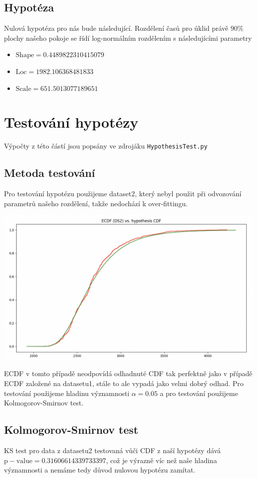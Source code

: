 \documentclass[11pt]{article}
\def\code#1{\texttt{#1}}
\begin{document}
\subsection{Hypotéza}
Nulová hypotéza pro nás bude následující. Rozdělení časů pro úklid právě $90\%$ plochy našeho pokoje se řídí log-normálním rozdělením s následujícími parametry
\begin{itemize}
	\item $\mathrm{Shape} = 0.4489822310415079$
	\item $\mathrm{Loc} = 1982.106368481833$
	\item $\mathrm{Scale}= 651.5013077189651$
\end{itemize}

\section{Testování hypotézy}
Výpočty z této částí jsou popsány ve zdrojáku \code{HypothesisTest.py}
\subsection{Metoda testování}
Pro testování hypotézu použijeme dataset2, který nebyl použit při odvozování parametrů našeho rozdělení, takže nedochází k over-fittingu.
\begin{center}
	\includegraphics[scale=0.4]{Images/ECDFDS2.png}
\end{center}
ECDF v tomto případě neodpovídá odhadnuté CDF tak perfektně jako v případě ECDF založené na datasetu1, stále to ale vypadá jako velmi dobrý odhad. Pro testování použijeme hladinu významnosti $\alpha=0.05$ a pro testování použijeme Kolmogorov-Smirnov test.
\subsection{Kolmogorov-Smirnov test}
KS test pro data z datasetu2 testovaná vůči CDF z naší hypotézy dává $\mathrm{p-value}=0.31606614339733397$, což je výrazně víc než naše hladina významnosti a nemáme tedy důvod nulovou hypotézu zamítat.
\end{document}
